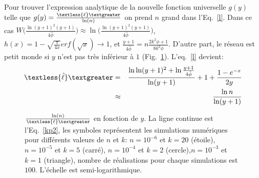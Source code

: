 Pour trouver l'expression analytique de la nouvelle fonction universelle $g(y)$ telle que $g(y)=\frac{\textless {\ell} \textgreater}{\ln(n)}$ on prend $n$ grand dans l'Eq.~\eqref{l}. Dans ce cas $W\big(\frac{\ln(y+1)^2(y+1)}{4\hat{\phi}}\big)\approx \ln \big(\frac{\ln(y+1)^2(y+1)}{4\hat{\phi}}\big)$,  $h(x)=1-\sqrt{\frac{\pi}{4x}}erf(\sqrt{x}) \longrightarrow 1$, et $\frac{y+1}{4\hat{\phi}}=n\frac{2k^2\phi+1}{8k^3\phi}$. D'autre part, le réseau est petit monde si $y$ n'est pas très inférieur à $1$ (Fig.~\ref{fu}). L'eq.~\eqref{l} devient:
\begin{eqnarray}
\textless {\hat\ell} \textgreater&=&\frac {\ln \ln(y+1)^2+\ln \frac{y+1}{4\hat{\phi}}}{\ln(y+1)}+1+\frac{1-e^{-x}}{2y} \nonumber\\
&\approx& \frac{\ln n}{\ln(y+1)}
\label{lc}
\end{eqnarray}
\begin{figure}[h!]
	\centering
	\caption{$\frac{\ln(n)}{\textless {\ell} \textgreater}$ en fonction de $y$. La ligne continue est l'Eq.~\eqref{kp2}, les symboles représentent les simulations numériques pour différents valeurs de $n$ et $k$: $n=10^{-6}$ et $k=20$ (étoile), $n=10^{-5}$ et $k=5$ (carré), $n=10^{-4}$ et $k=2$ (cercle),$n=10^{-3}$ et $k=1$ (triangle), nombre de réalisations pour chaque simulations est $100$. L'échelle est semi-logarithmique.}
	\label{fu}
\end{figure}
